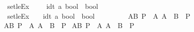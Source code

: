 \begin{isabellebody}
\ \ {\isachardoublequoteopen}{\isacharunderscore}{\kern0pt}setleEx{\isachardoublequoteclose}\ \ \ \ {\isacharcolon}{\kern0pt}{\isacharcolon}{\kern0pt}\ {\isachardoublequoteopen}{\isacharbrackleft}{\kern0pt}idt{\isacharcomma}{\kern0pt}\ {\isacharprime}{\kern0pt}a{\isacharcomma}{\kern0pt}\ bool{\isacharbrackright}{\kern0pt}\ {\isasymRightarrow}\ bool{\isachardoublequoteclose}\ \ \ {\isacharparenleft}{\kern0pt}{\isachardoublequoteopen}{\isacharparenleft}{\kern0pt}{}{\isasymexists}{\isacharunderscore}{\kern0pt}{\isasymsubseteq}{\isacharunderscore}{\kern0pt}{\isachardot}{\kern0pt}{\isacharslash}{\kern0pt}\ {\isacharunderscore}{\kern0pt}{\isacharparenright}{\kern0pt}{\isachardoublequoteclose}\ {\isacharbrackleft}{\kern0pt}{}{\isacharcomma}{\kern0pt}\ {}{\isacharcomma}{\kern0pt}\ {}{}{\isacharbrackright}{\kern0pt}\ {}{}{\isacharparenright}{\kern0pt}\isanewline
\ \ {\isachardoublequoteopen}{\isacharunderscore}{\kern0pt}setleEx{}{\isachardoublequoteclose}\ \ \ {\isacharcolon}{\kern0pt}{\isacharcolon}{\kern0pt}\ {\isachardoublequoteopen}{\isacharbrackleft}{\kern0pt}idt{\isacharcomma}{\kern0pt}\ {\isacharprime}{\kern0pt}a{\isacharcomma}{\kern0pt}\ bool{\isacharbrackright}{\kern0pt}\ {\isasymRightarrow}\ bool{\isachardoublequoteclose}\ \ \ {\isacharparenleft}{\kern0pt}{\isachardoublequoteopen}{\isacharparenleft}{\kern0pt}{}{\isasymexists}{\isacharbang}{\kern0pt}{\isacharunderscore}{\kern0pt}{\isasymsubseteq}{\isacharunderscore}{\kern0pt}{\isachardot}{\kern0pt}{\isacharslash}{\kern0pt}\ {\isacharunderscore}{\kern0pt}{\isacharparenright}{\kern0pt}{\isachardoublequoteclose}\ {\isacharbrackleft}{\kern0pt}{}{\isacharcomma}{\kern0pt}\ {}{\isacharcomma}{\kern0pt}\ {}{}{\isacharbrackright}{\kern0pt}\ {}{}{\isacharparenright}{\kern0pt}\isanewline
\isanewline
{}\isamarkupfalse%
\isanewline
\ {\isachardoublequoteopen}{\isasymforall}A{\isasymsubset}B{\isachardot}{\kern0pt}\ P{\isachardoublequoteclose}\ {\isasymrightharpoonup}\ {\isachardoublequoteopen}{\isasymforall}A{\isachardot}{\kern0pt}\ A\ {\isasymsubset}\ B\ {\isasymlongrightarrow}\ P{\isachardoublequoteclose}\isanewline
\ {\isachardoublequoteopen}{\isasymexists}A{\isasymsubset}B{\isachardot}{\kern0pt}\ P{\isachardoublequoteclose}\ {\isasymrightharpoonup}\ {\isachardoublequoteopen}{\isasymexists}A{\isachardot}{\kern0pt}\ A\ {\isasymsubset}\ B\ {\isasymand}\ P{\isachardoublequoteclose}\isanewline
\ {\isachardoublequoteopen}{\isasymforall}A{\isasymsubseteq}B{\isachardot}{\kern0pt}\ P{\isachardoublequoteclose}\ {\isasymrightharpoonup}\ {\isachardoublequoteopen}{\isasymforall}A{\isachardot}{\kern0pt}\ A\ {\isasymsubseteq}\ B\ {\isasymlongrightarrow}\ P{\isachardoublequoteclose}\isanewline

\end{isabellebody}
